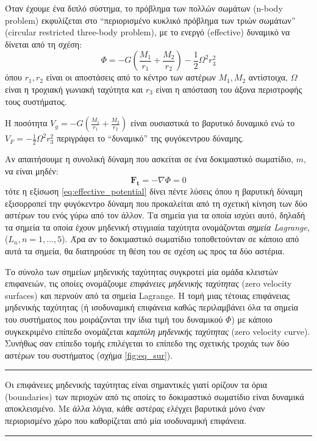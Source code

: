 Όταν έχουμε ένα διπλό σύστημα, το πρόβλημα των πολλών σωμάτων (n-body problem) εκφυλίζεται στο ``περιορισμένο κυκλικό πρόβλημα των τριών σωμάτων'' (circular restricted three-body problem), με το ενεργό (effective) δυναμικό να δίνεται από τη σχέση:
\begin{equation}
    \label{eq:effective_potential}
    \Phi = - G \left( \frac{M_1}{r_1} + \frac{M_2}{r_2} \right) - \frac{1}{2} \Omega^2 r_3^2
\end{equation}
όπου  $r_1, r_2$ είναι οι αποστάσεις από το κέντρο των αστέρων $M_1, M_2$ αντίστοιχα, $\Omega$ είναι η τροχιακή γωνιακή ταχύτητα και $r_3$ είναι η απόσταση του άξονα περιστροφής τους συστήματος.

Η ποσότητα $\displaystyle V_g = - G \left( \frac{M_1}{r_1} + \frac{M_2}{r_2} \right)$ είναι ουσιαστικά το βαρυτικό δυναμικό ενώ το $\displaystyle V_F = - \frac{1}{2} \Omega^2 r_3^2$ περιγράφει το ``δυναμικό'' της φυγόκεντρου δύναμης. 

Αν απαιτήσουμε η συνολική δύναμη που ασκείται σε ένα δοκιμαστικό σωματίδιο, $m$, να είναι μηδέν: $$\boldsymbol{F_t} = - \nabla \Phi = 0$$
τότε η εξίσωση \eqref{eq:effective_potential} δίνει πέντε λύσεις όπου η βαρυτική δύναμη εξισορροπεί την φυγόκεντρο δύναμη που προκαλείται από τη σχετική κίνηση των δύο αστέρων του ενός γύρω από τον άλλον. Τα σημεία για τα οποία ισχύει αυτό, δηλαδή τα σημεία τα οποία έχουν μηδενική στιγμιαία ταχύτητα ονομάζονται \textit{σημεία Lagrange}, ($L_n, n = 1, \dots, 5$). Άρα αν το δοκιμαστικό σωματίδιο τοποθετούνταν σε κάποιο από αυτά τα σημεία, θα διατηρούσε τη θέση του σε σχέση ως προς τα δύο αστέρια.

Το σύνολο των σημείων μηδενικής ταχύτητας συγκροτεί μία ομάδα κλειστών επιφανειών, τις οποίες ονομάζουμε \textit{επιφάνειες μηδενικής ταχύτητας} (zero velocity surfaces) και περνούν από τα σημεία Lagrange. Η τομή μιας τέτοιας επιφάνειας μηδενικής ταχύτητας (ή ισοδυναμική επιφάνεια καθώς περιλαμβάνει όλα τα σημεία του συστήματος που μοιράζονται την ίδια τιμή του δυναμικού $\Phi$) με κάποιο συγκεκριμένο επίπεδο ονομάζεται \textit{καμπύλη μηδενικής ταχύτητας} (zero velocity curve). Συνήθως σαν επίπεδο τομής επιλέγεται το επίπεδο της σχετικής τροχιάς των δύο αστέρων του συστήματος (σχήμα \ref{fig:eq_sur}).
\\
{\color{red} \hrule}
Οι επιφάνειες μηδενικής ταχύτητας είναι σημαντικές γιατί ορίζουν τα όρια (boundaries) των περιοχών από τις οποίες το δοκιμαστικό σωματίδιο είναι δυναμικά αποκλεισμένο. Με άλλα λόγια, κάθε αστέρας ελέγχει βαρυτικά μόνο έναν περιορισμένο χώρο που καθορίζεται από μία ισοδυναμική επιφάνεια.
{\color{red} \hrule}

